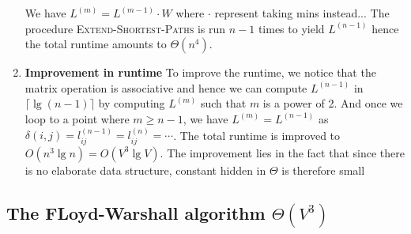 \documentclass[11pt]{article}
\begin{document}
\begin{defn*}
\begin{enumerate}
\[        \]
        We have $L^{(m)} = L^{(m-1)}\cdot W$ where $\cdot$ represent taking mins instead... The procedure \textsc{Extend-Shortest-Paths} is run $n-1$ times to yield $L^{(n-1)}$ hence the total runtime amounts to $\Theta(n^4)$. 
        \item \textbf{Improvement in runtime} To improve the runtime, we notice that the matrix operation is associative and hence we can compute $L^{(n-1)}$ in $\lceil \lg (n-1) \rceil$ by computing $L^{(m)}$ such that $m$ is a power of 2. And once we loop to a point where $m \geq n-1$, we have $L^{(m)} = L^{(n-1)}$ as $\delta(i, j) = l_{ij}^{(n-1)} = l_{ij}^{(n)} = \cdots$. The total runtime is improved to $O(n^3 \lg n) = O(V^3 \lg V)$. The improvement lies in the fact that since there is no elaborate data structure, constant hidden in $\Theta$ is therefore small
    \end{enumerate}
\end{defn*}



\subsection*{The FLoyd-Warshall algorithm $\Theta(V^3)$}
\end{document}
